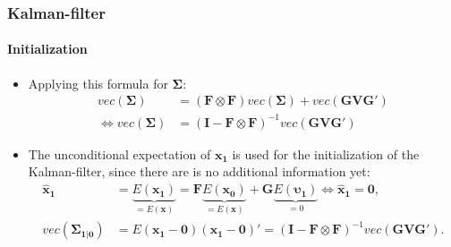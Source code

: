 \documentclass{beamer} %
\begin{document}
\begin{frame}\frametitle{Kalman-filter}\framesubtitle{Initialization}
  \begin{itemize}
        \item Applying this formula for $\boldsymbol{\Sigma}$:
\begin{align*}
    vec(\boldsymbol{\Sigma}) &= (\mathbf{F} \otimes \mathbf{F} ) vec(\boldsymbol{\Sigma}) + vec(\mathbf{G} \mathbf{V} \mathbf{G}')\\
\Leftrightarrow    vec(\boldsymbol{\Sigma}) &= (\mathbf{I}-\mathbf{F} \otimes \mathbf{F})^{-1} vec(\mathbf{G} \mathbf{V} \mathbf{G}')
\end{align*}
\item The unconditional expectation of $\mathbf{x_1}$ is used for the initialization of the Kalman-filter, since there are is no additional information yet:
\begin{align*}
\mathbf{\widehat{x}_1} &= \underbrace{E(\mathbf{x_1})}_{=E(\mathbf{x})} = \mathbf{F }\underbrace{E(\mathbf{x_0})}_{=E(\mathbf{x})} + \mathbf{G}\underbrace{E(\boldsymbol{\upsilon_1})}_{=0} \Leftrightarrow \mathbf{\widehat{x}_1} = \mathbf{0},\\
vec(\boldsymbol{\Sigma_{1|0}}) & = E(\mathbf{x_1}-\textbf{0})(\mathbf{x_1}-\textbf{0})'=(\mathbf{I}-\mathbf{F} \otimes \mathbf{F})^{-1} vec(\mathbf{G} \mathbf{V} \mathbf{G}').
\end{align*}

  \end{itemize}
\end{frame}
\end{document}
